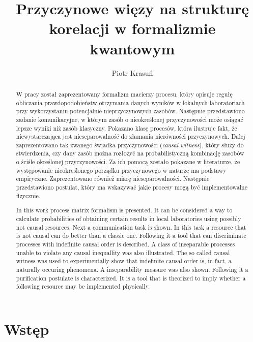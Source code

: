 \documentclass[10pt]{article} %
\title{Przyczynowe więzy na strukturę korelacji w formalizmie kwantowym}
\author{Piotr Krasuń}
\begin{document}
\maketitle

\newpage
\begin{abstract}
W pracy został zaprezentowany formalizm macierzy procesu, który opisuje regułę obliczania prawdopodobieństw otrzymania danych wyników w lokalnych laboratoriach przy wykorzystaniu potencjalnie nieprzyczynowych zasobów. Następnie przedstawiono zadanie komunikacyjne, w którym zasób o nieokreślonej przyczynowości może osiągać lepsze wyniki niż zasób klasyczny. Pokazano klasę procesów, która ilustruje fakt, że niewystarczająca jest nieseparowalność do złamania nierówności przyczynowych. Dalej zaprezentowano tak zwanego świadka przyczynowości (\textit{causal witness}), który służy do stwierdzenia, czy dany zasób można rozłożyć na probabilistyczną kombinację zasobów o ściśle określonej przyczynowości. Za ich pomocą zostało pokazane w literaturze, że występowanie nieokreślonego porządku przyczynowego w naturze ma podstawy empiryczne. Zaprezentowano również miarę nieseparowalności. Następnie przedstawiono postulat, który ma wskazywać jakie procesy mogą być implementowalne fizycznie.
\end{abstract}
\renewcommand{\abstractname}{Abstract}
\begin{abstract}
In this work process matrix formalism is presented. It can be considered a way to calculate probabilities of obtaining certain results in local laboratories using possibly not causal resources. Next a communication task is shown. In this task a resource that is not causal can do better than a classic one. Following it a tool that can discriminate processes with indefinite causal order is described. A class of inseparable processes unable to violate any causal inequallity was also illustrated. The so called causal witness was used to experimentally show that indefinite causal order is, in fact, a naturally occuring phenomena. A inseparability measure was also shown. Following it a purification postulate is characterized. It is a tool that is theorized to imply whether a following resource may be implemented physically.
\end{abstract}
\section{Wstęp}
\end{document}
